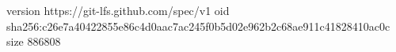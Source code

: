 version https://git-lfs.github.com/spec/v1
oid sha256:c26e7a40422855e86c4d0aac7ac245f0b5d02e962b2c68ae911c41828410ac0c
size 886808
